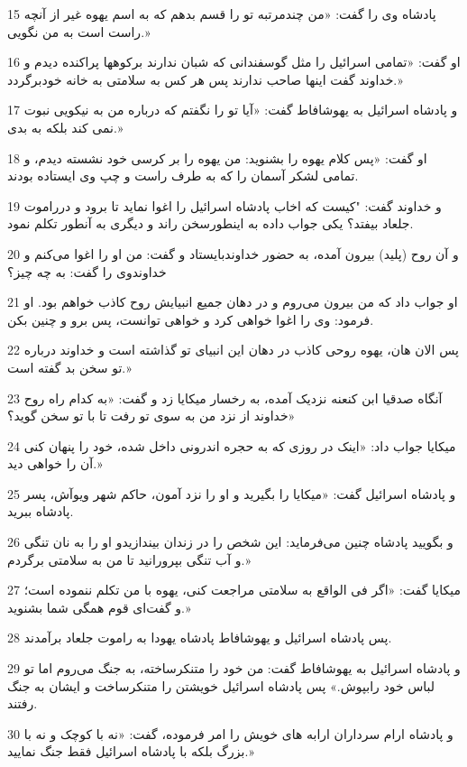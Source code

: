 \par 15 پادشاه وی را گفت: «من چندمرتبه تو را قسم بدهم که به اسم یهوه غیر از آنچه راست است به من نگویی.»
\par 16 او گفت: «تمامی اسرائیل را مثل گوسفندانی که شبان ندارند برکوهها پراکنده دیدم و خداوند گفت اینها صاحب ندارند پس هر کس به سلامتی به خانه خودبرگردد.» 
\par 17 و پادشاه اسرائیل به یهوشافاط گفت: «آیا تو را نگفتم که درباره من به نیکویی نبوت نمی کند بلکه به بدی.»
\par 18 او گفت: «پس کلام یهوه را بشنوید: من یهوه را بر کرسی خود نشسته دیدم، و تمامی لشکر آسمان را که به طرف راست و چپ وی ایستاده بودند.
\par 19 و خداوند گفت: "کیست که اخاب پادشاه اسرائیل را اغوا نماید تا برود و درراموت جلعاد بیفتد؟ یکی جواب داده به اینطورسخن راند و دیگری به آنطور تکلم نمود.
\par 20 و آن روح (پلید) بیرون آمده، به حضور خداوندبایستاد و گفت: من او را اغوا می‌کنم و خداوندوی را گفت: به چه چیز؟
\par 21 او جواب داد که من بیرون می‌روم و در دهان جمیع انبیایش روح کاذب خواهم بود. او فرمود: وی را اغوا خواهی کرد و خواهی توانست، پس برو و چنین بکن.
\par 22 پس الان هان، یهوه روحی کاذب در دهان این انبیای تو گذاشته است و خداوند درباره تو سخن بد گفته است.»
\par 23 آنگاه صدقیا ابن کنعنه نزدیک آمده، به رخسار میکایا زد و گفت: «به کدام راه روح خداوند از نزد من به سوی تو رفت تا با تو سخن گوید؟»
\par 24 میکایا جواب داد: «اینک در روزی که به حجره اندرونی داخل شده، خود را پنهان کنی آن را خواهی دید.»
\par 25 و پادشاه اسرائیل گفت: «میکایا را بگیرید و او را نزد آمون، حاکم شهر ویوآش، پسر پادشاه ببرید.
\par 26 و بگویید پادشاه چنین می‌فرماید: این شخص را در زندان بیندازیدو او را به نان تنگی و آب تنگی بپرورانید تا من به سلامتی برگردم.»
\par 27 میکایا گفت: «اگر فی الواقع به سلامتی مراجعت کنی، یهوه با من تکلم ننموده است؛ و گفت‌ای قوم همگی شما بشنوید.»
\par 28 پس پادشاه اسرائیل و یهوشافاط پادشاه یهودا به راموت جلعاد برآمدند.
\par 29 و پادشاه اسرائیل به یهوشافاط گفت: من خود را متنکرساخته، به جنگ می‌روم اما تو لباس خود رابپوش.» پس پادشاه اسرائیل خویشتن را متنکرساخت و ایشان به جنگ رفتند.
\par 30 و پادشاه ارام سرداران ارابه های خویش را امر فرموده، گفت: «نه با کوچک و نه با بزرگ بلکه با پادشاه اسرائیل فقط جنگ نمایید.»
